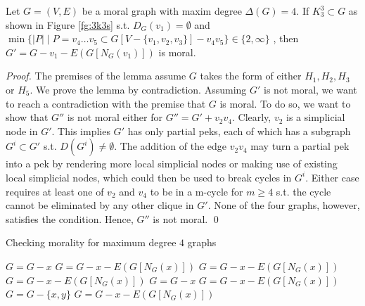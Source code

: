 \begin{lemma}
\label{lm:3k3s_h124}
Let $G=(V,E)$ be a moral graph with maxim degree $\Delta(G)=4$. If $K_3^3\subset G$ as shown in Figure \ref{fg:3k3s} s.t. $D_G(v_1)=\emptyset$ and $\min\{|P|\mid P=v_4\dots v_5 \subset G[V-\{v_1,v_2,v_3\}]-v_4v_5\} \in \{2, \infty\}$ , then $G'=G-v_1-E(G[N_G(v_1)])$ is moral.  
\end{lemma}
\begin{proof}
The premises of the lemma assume $G$ takes the form of either $H_1, H_2, H_3$ or $H_5$. We prove the lemma by contradiction. Assuming $G'$ is not moral, we want to reach a contradiction with the premise that $G$ is moral. To do so, we want to show that $G''$ is not moral either for $G''=G'+v_2v_4$. Clearly, $v_2$ is a simplicial node in $G'$. This implies $G'$ has only partial peks, each of which has a subgraph $G^i \subset G'$ s.t. $D(G^i)\neq \emptyset$. The addition of the edge $v_2v_4$ may turn a partial pek into a pek by rendering more local simplicial nodes or making use of existing local simplicial nodes, which could then be used to break cycles in $G^i$. Either case requires at least one of $v_2$ and $v_4$ to be in a m-cycle for $m \ge 4$ s.t. the cycle cannot be eliminated by any other clique in $G'$. None of the four graphs, however, satisfies the condition. Hence, $G''$ is not moral. \qed
\end{proof}

\begin{algorithm}[]
\caption{Checking morality for maximum degree $4$ graphs}
\label{alg:d_wrs_deg4}
\begin{algorithmic}[]
    
       \State {}
    \EndIf
    
     
    
       \State $G=G-x$
       \State $G=G-x-E(G[N_G(x)])$
     
       \State $G=G-x-E(G[N_G(x)])$
       \State $G=G-x-E(G[N_G(x)])$
       \State $G=G-x$
    \Else {}
    	 
    		\State $G=G-x-E(G[N_G(x)])$
    	\Else 
    		 
       			\State $G=G-\{x,y\}$
   			\Else {}
       			\State $G=G-x-E(G[N_G(x)])$
       		\EndIf
    	\EndIf
    	
       
    \EndIf
    
    \EndWhile
    
    \State {}
    
\end{algorithmic}
\end{algorithm}

